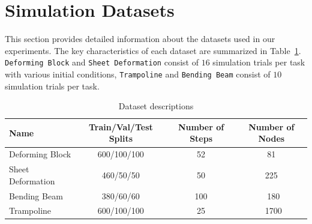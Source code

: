 \section{Simulation Datasets} \label{app:dataset}
%
This section provides detailed information about the datasets used in our experiments. 
%
The key characteristics of each dataset are summarized in Table~\ref{tab:dataset_description}. \texttt{Deforming Block} and \texttt{Sheet Deformation} consist of $16$ simulation trials per task with various initial conditions, \texttt{Trampoline} and \texttt{Bending Beam} consist of $10$ simulation trials per task.
%
\begin{table}[h]
\centering
\caption{Dataset descriptions}
\label{tab:dataset_description}
\begin{tabular}{lccc}
\toprule
Name & Train/Val/Test Splits & Number of Steps & Number of Nodes \\
\midrule
Deforming Block       & 600/100/100   & 52  & 81 \\
Sheet Deformation & 460/50/50 & 50  &  225 \\
Bending Beam & 380/60/60 & 100 & ~180 \\
Trampoline  & 600/100/100 & 25  &  ~1700 \\
\bottomrule
\end{tabular}
\end{table}
%


